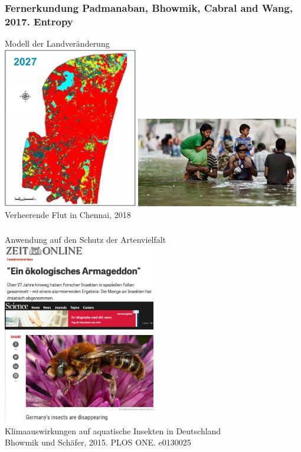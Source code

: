 \documentclass{beamer}
\begin{document}

\begin{frame}
\frametitle{Fernerkundung \hspace{1cm} \tiny Padmanaban, Bhowmik, Cabral and Wang, 2017. Entropy}
Modell der Landveränderung\\[0.2cm]
\includegraphics[width=0.44\textwidth]{Figures/RS2.png}
\includegraphics[width=0.53\textwidth]{Figures/chennai.png}\\
\raggedleft\small Verheerende Flut in Chennai, 2018
\end{frame}


\begin{frame}
\frametitle{}
\centering
\large Anwendung auf den Schutz der Artenvielfalt\\[0.2cm]
\pause
\includegraphics[width=0.5\textwidth]{Figures/news.png}\\
\pause
\small \alert{Klimaauswirkungen auf aquatische Insekten in Deutschland}\\
\scriptsize Bhowmik und Schäfer, 2015. PLOS ONE. e0130025
\end{frame}
\end{document}
